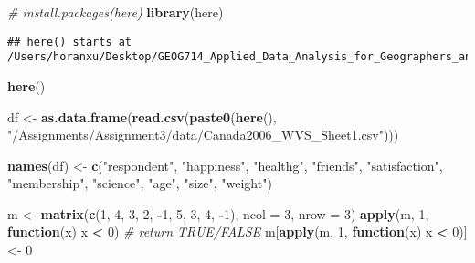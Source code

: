 \documentclass[
]{article}
\newenvironment{Shaded}{\begin{snugshade}}{\end{snugshade}}
\newcommand{\AttributeTok}[1]{\textcolor[rgb]{0.13,0.29,0.53}{#1}}
\newcommand{\CommentTok}[1]{\textcolor[rgb]{0.56,0.35,0.01}{\textit{#1}}}
\newcommand{\ControlFlowTok}[1]{\textcolor[rgb]{0.13,0.29,0.53}{\textbf{#1}}}
\newcommand{\DecValTok}[1]{\textcolor[rgb]{0.00,0.00,0.81}{#1}}
\newcommand{\FunctionTok}[1]{\textcolor[rgb]{0.13,0.29,0.53}{\textbf{#1}}}
\newcommand{\NormalTok}[1]{#1}
\newcommand{\OtherTok}[1]{\textcolor[rgb]{0.56,0.35,0.01}{#1}}
\newcommand{\SpecialCharTok}[1]{\textcolor[rgb]{0.81,0.36,0.00}{\textbf{#1}}}
\newcommand{\StringTok}[1]{\textcolor[rgb]{0.31,0.60,0.02}{#1}}
\begin{document}
\begin{Shaded}
\begin{Highlighting}[]
\CommentTok{\# install.packages(\textquotesingle{}here\textquotesingle{})}
\FunctionTok{library}\NormalTok{(here)}
\end{Highlighting}
\end{Shaded}

\begin{verbatim}
## here() starts at /Users/horanxu/Desktop/GEOG714_Applied_Data_Analysis_for_Geographers_and_Earth_Scientists
\end{verbatim}

\begin{Shaded}
\begin{Highlighting}[]
\FunctionTok{here}\NormalTok{()}

\NormalTok{df }\OtherTok{\textless{}{-}} \FunctionTok{as.data.frame}\NormalTok{(}\FunctionTok{read.csv}\NormalTok{(}\FunctionTok{paste0}\NormalTok{(}\FunctionTok{here}\NormalTok{(), }\StringTok{"/Assignments/Assignment3/data/Canada2006\_WVS\_Sheet1.csv"}\NormalTok{)))}

\FunctionTok{names}\NormalTok{(df) }\OtherTok{\textless{}{-}} \FunctionTok{c}\NormalTok{(}\StringTok{"respondent"}\NormalTok{, }\StringTok{"happiness"}\NormalTok{, }\StringTok{"healthg"}\NormalTok{, }\StringTok{"friends"}\NormalTok{, }\StringTok{"satisfaction"}\NormalTok{, }\StringTok{"membership"}\NormalTok{,}
    \StringTok{"science"}\NormalTok{, }\StringTok{"age"}\NormalTok{, }\StringTok{"size"}\NormalTok{, }\StringTok{"weight"}\NormalTok{)}

\NormalTok{m }\OtherTok{\textless{}{-}} \FunctionTok{matrix}\NormalTok{(}\FunctionTok{c}\NormalTok{(}\DecValTok{1}\NormalTok{, }\DecValTok{4}\NormalTok{, }\DecValTok{3}\NormalTok{, }\DecValTok{2}\NormalTok{, }\SpecialCharTok{{-}}\DecValTok{1}\NormalTok{, }\DecValTok{5}\NormalTok{, }\DecValTok{3}\NormalTok{, }\DecValTok{4}\NormalTok{, }\SpecialCharTok{{-}}\DecValTok{1}\NormalTok{), }\AttributeTok{ncol =} \DecValTok{3}\NormalTok{, }\AttributeTok{nrow =} \DecValTok{3}\NormalTok{)}
\FunctionTok{apply}\NormalTok{(m, }\DecValTok{1}\NormalTok{, }\ControlFlowTok{function}\NormalTok{(x) x }\SpecialCharTok{\textless{}} \DecValTok{0}\NormalTok{)  }\CommentTok{\# return TRUE/FALSE}
\NormalTok{m[}\FunctionTok{apply}\NormalTok{(m, }\DecValTok{1}\NormalTok{, }\ControlFlowTok{function}\NormalTok{(x) x }\SpecialCharTok{\textless{}} \DecValTok{0}\NormalTok{)] }\OtherTok{\textless{}{-}} \DecValTok{0}
\end{Highlighting}
\end{Shaded}
\end{document}
